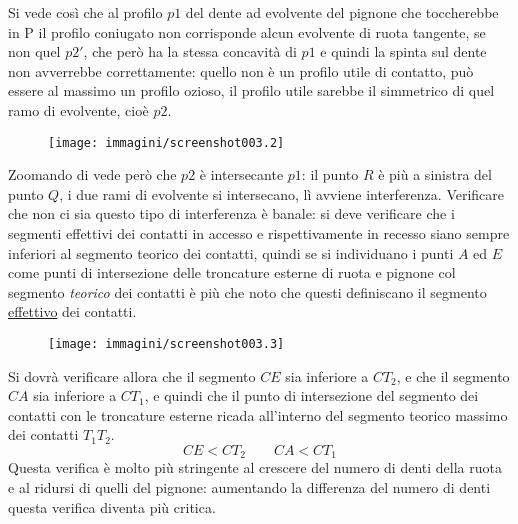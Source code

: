 \documentclass[a4paper, 15pt]{article}
\begin{document}
\begin{adjustwidth}{2in}{}
		Si vede così che al profilo $p1$ del dente ad evolvente del pignone che toccherebbe in P il profilo coniugato non corrisponde alcun evolvente di ruota tangente, se non quel $p2'$, che però ha la stessa concavità di $p1$ e quindi la spinta sul dente non avverrebbe correttamente: quello non è un profilo utile di contatto, può essere al massimo un profilo ozioso, il profilo utile sarebbe il simmetrico di quel ramo di evolvente, cioè $p2$.
		\begin{figure}[H]
	\centering
	\texttt{[image: immagini/screenshot003.2]}
	\label{fig:screenshot003.2}
		\end{figure}				
		Zoomando di vede però che $p2$ è intersecante $p1$: il punto $R$ è più a sinistra del punto $Q$, i due rami di evolvente si intersecano, lì avviene interferenza.
\newpage				
		Verificare che non ci sia questo tipo di interferenza è banale: si deve verificare che i segmenti effettivi dei contatti in accesso e rispettivamente in recesso siano sempre inferiori al segmento teorico dei contatti, quindi se si individuano i punti $A$ ed $E$ come punti di intersezione delle troncature esterne di ruota e pignone col segmento \textit{teorico} dei contatti è più che noto che questi definiscano il segmento \underline{effettivo} dei contatti. 		
		\begin{figure}[H]
			\centering
			\texttt{[image: immagini/screenshot003.3]}
			\label{fig:screenshot003.3}
		\end{figure}
		Si dovrà verificare allora che il segmento $CE$ sia inferiore a $CT_2$, e che il segmento $CA$ sia inferiore a $CT_1$, e quindi che il punto di intersezione del segmento dei contatti con le troncature esterne ricada all'interno del segmento teorico massimo dei contatti $T_1T_2$. 
		\[CE<CT_2\qquad CA<CT_1\]		
		Questa verifica è molto più stringente al crescere del numero di denti della ruota e al ridursi di quelli del pignone: aumentando la differenza del numero di denti questa verifica diventa più critica. \newline
		

\end{adjustwidth}
\end{document}
